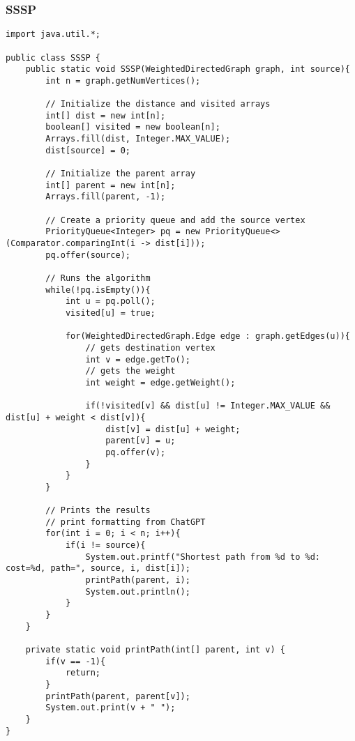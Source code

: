 \documentclass[10pt]{article}
\begin{document}
\subsubsection{SSSP}
\lstset{numbers=left, numberstyle=\tiny, stepnumber=1, numbersep=5pt, basicstyle=\footnotesize\ttfamily}
\begin{lstlisting}[frame=single, ]  
import java.util.*;

public class SSSP {
    public static void SSSP(WeightedDirectedGraph graph, int source){
        int n = graph.getNumVertices();
        
        // Initialize the distance and visited arrays
        int[] dist = new int[n];
        boolean[] visited = new boolean[n];
        Arrays.fill(dist, Integer.MAX_VALUE);
        dist[source] = 0;

        // Initialize the parent array
        int[] parent = new int[n];
        Arrays.fill(parent, -1);

        // Create a priority queue and add the source vertex
        PriorityQueue<Integer> pq = new PriorityQueue<>(Comparator.comparingInt(i -> dist[i]));
        pq.offer(source);

        // Runs the algorithm
        while(!pq.isEmpty()){
            int u = pq.poll();
            visited[u] = true;
            
            for(WeightedDirectedGraph.Edge edge : graph.getEdges(u)){
                // gets destination vertex
                int v = edge.getTo();
                // gets the weight
                int weight = edge.getWeight();
                
                if(!visited[v] && dist[u] != Integer.MAX_VALUE && dist[u] + weight < dist[v]){
                    dist[v] = dist[u] + weight;
                    parent[v] = u;
                    pq.offer(v);
                }
            }
        }

        // Prints the results
        // print formatting from ChatGPT
        for(int i = 0; i < n; i++){
            if(i != source){
                System.out.printf("Shortest path from %d to %d: cost=%d, path=", source, i, dist[i]);
                printPath(parent, i);
                System.out.println();
            }
        }
    }

    private static void printPath(int[] parent, int v) {
        if(v == -1){
            return;
        }
        printPath(parent, parent[v]);
        System.out.print(v + " ");
    }
}
\end{lstlisting}
\end{document}
